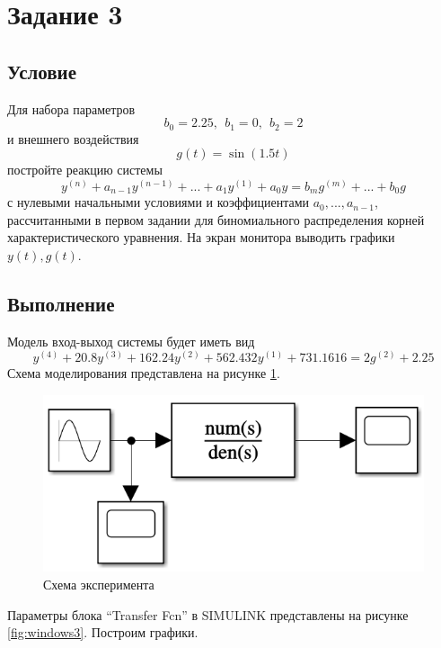 \documentclass[a4paper, 12pt]{article}
\begin{document}
    \section{Задание 3}
    \subsection{Условие}
    Для набора параметров $$b_0=2.25,\ \ b_1=0,\ \ b_2=2$$ и внешнего воздействия
    $$g(t)=\sin{\left(1.5t\right)}$$ постройте реакцию системы
    $$y^{(n)}+a_{n-1}y^{(n-1)}+...+a_1y^{(1)}+a_0y=b_mg^{(m)}+...+b_0g$$ с нулевыми начальными
    условиями и коэффициентами $a_0,...,a_{n-1}$, рассчитанными
    в первом задании для биномиального распределения корней характеристического уравнения.
    На экран монитора выводить графики $y(t),g(t)$.


    \subsection{Выполнение}
    Модель вход-выход системы будет иметь вид
    $$y^{(4)}+20.8y^{(3)}+162.24y^{(2)}+562.432y^{(1)}+731.1616=2g^{(2)}+2.25$$
    Схема моделирования представлена на рисунке \ref{fig:scheme3}.
    \begin{figure}[H]
        \centering
        \includegraphics[scale=0.8]{scheme3.png}
        \captionsetup{skip=0pt}
        \caption{Схема эксперимента}
        \label{fig:scheme3}
    \end{figure}
    Параметры блока ``Transfer Fcn'' в SIMULINK представлены на рисунке \ref{fig:windows3}. Построим графики.
\end{document}
